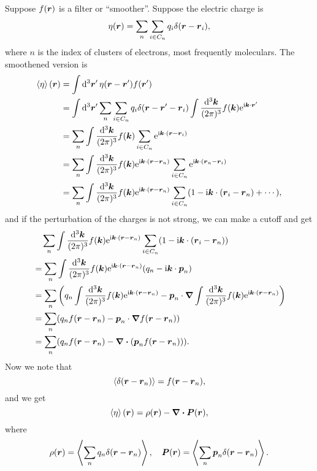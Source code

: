 \documentclass[hyperref, a4paper]{article}
\newcommand*{\ii}{\mathrm{i}}
\newcommand*{\ee}{\mathrm{e}}
\begin{document}
Suppose $f(\vb*{r})$ is a filter or ``smoother''. Suppose the electric charge is 
\begin{equation}
    \eta(\vb*{r}) = \sum_n \sum_{i \in C_n} q_i \delta(\vb*{r} - \vb*{r}_i),
\end{equation}
where $n$ is the index of clusters of electrons, most frequently moleculars. The smoothened version is 
\[
    \begin{aligned}
        \expval{\eta}(\vb*{r}) &= \int \dd[3]{\vb*{r}'} \eta(\vb*{r} - \vb*{r}') f(\vb*{r}') \\
        &= \int \dd[3]{\vb*{r}'} \sum_n \sum_{i \in C_n} q_i \delta(\vb*{r} - \vb*{r}' - \vb*{r}_i) 
        \int \frac{\dd[3]{\vb*{k}}}{(2\pi)^3} f(\vb*{k}) \ee^{\ii \vb*{k} \cdot \vb*{r}'} \\
        &= \sum_n \int \frac{\dd[3]{\vb*{k}}}{(2\pi)^3} f(\vb*{k}) \sum_{i \in C_n} \ee^{\ii \vb*{k} \cdot (\vb*{r} - \vb*{r}_i)} \\
        &= \sum_n \int \frac{\dd[3]{\vb*{k}}}{(2\pi)^3} f(\vb*{k}) \ee^{\ii \vb*{k} \cdot (\vb*{r} - \vb*{r}_n)} \sum_{i \in C_n} \ee^{\ii \vb*{k} \cdot (\vb*{r}_n - \vb*{r}_i)} \\
        &= \sum_n \int \frac{\dd[3]{\vb*{k}}}{(2\pi)^3} f(\vb*{k}) \ee^{\ii \vb*{k} \cdot (\vb*{r} - \vb*{r}_n)} \sum_{i \in C_n} (1 - \ii \vb*{k} \cdot (\vb*{r}_i - \vb*{r}_n) + \cdots),
    \end{aligned}
\]
and if the perturbation of the charges is not strong, we can make a cutoff and get 
\[
    \begin{aligned}
        &\quad \sum_n \int \frac{\dd[3]{\vb*{k}}}{(2\pi)^3} f(\vb*{k}) \ee^{\ii \vb*{k} \cdot (\vb*{r} - \vb*{r}_n)} \sum_{i \in C_n} (1 - \ii \vb*{k} \cdot (\vb*{r}_i - \vb*{r}_n)) \\
        &= \sum_n \int \frac{\dd[3]{\vb*{k}}}{(2\pi)^3} f(\vb*{k}) \ee^{\ii \vb*{k} \cdot (\vb*{r} - \vb*{r}_n)} (q_n - \ii \vb*{k} \cdot \vb*{p}_n) \\
        &= \sum_n \left( q_n \int \frac{\dd[3]{\vb*{k}}}{(2\pi)^3} f(\vb*{k}) \ee^{\ii \vb*{k} \cdot (\vb*{r} - \vb*{r}_n)} - \vb*{p}_n \cdot \grad \int \frac{\dd[3]{\vb*{k}}}{(2\pi)^3} f(\vb*{k}) \ee^{\ii \vb*{k} \cdot (\vb*{r} - \vb*{r}_n)}  \right) \\
        &= \sum_n (q_n f(\vb*{r} - \vb*{r}_n) - \vb*{p}_n \cdot \grad f(\vb*{r} - \vb*{r}_n)) \\
        &= \sum_n (q_n f(\vb*{r} - \vb*{r}_n) - \div(\vb*{p}_n f(\vb*{r} - \vb*{r}_n))) .
    \end{aligned}
\]
Now we note that 
\[
    \expval{ \delta(\vb*{r} - \vb*{r}_n)} = f(\vb*{r} - \vb*{r}_n), 
\]
and we get 
\begin{equation}
    \expval{\eta}(\vb*{r}) = \rho(\vb*{r}) - \div{\vb*{P}(\vb*{r})},
\end{equation}
where 
\begin{equation}
    \rho(\vb*{r}) = \expval{\sum_n q_n \delta(\vb*{r} - \vb*{r}_n)}, \quad 
    \vb*{P}(\vb*{r}) = \expval{\sum_n \vb*{p}_n \delta(\vb*{r} - \vb*{r}_n)}   .
\end{equation}
\end{document}
